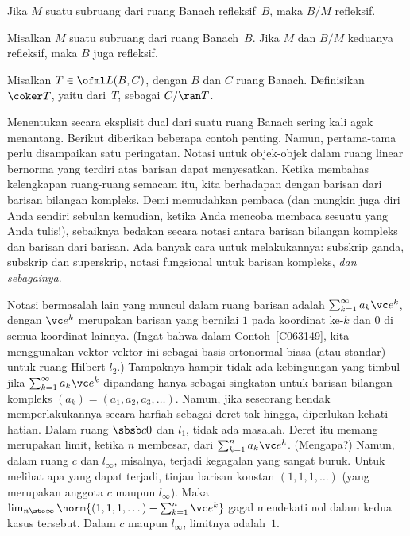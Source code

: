 \begin{cor} Jika $M$ suatu subruang dari ruang Banach refleksif~$B$, maka $B/M$ refleksif.
\end{cor}

\begin{cor} Misalkan $M$ suatu subruang dari ruang Banach~$B$. Jika $M$ dan $B/M$ keduanya refleksif,
maka $B$ juga refleksif.
\end{cor}



















\begin{defn} Misalkan $T \in \ofml L(B,C)$, dengan $B$ dan $C$ ruang Banach. Definisikan
$\coker T$, yaitu
 dari~$T$, sebagai $C/\ran T$.
\end{defn}



Menentukan secara eksplisit dual dari suatu ruang Banach sering kali agak menantang. Berikut diberikan beberapa
contoh penting. Namun, pertama-tama perlu disampaikan satu peringatan. Notasi untuk objek-objek dalam ruang linear bernorma
yang terdiri atas barisan dapat menyesatkan. Ketika membahas kelengkapan ruang-ruang semacam itu, kita berhadapan dengan barisan dari
barisan bilangan kompleks. Demi memudahkan pembaca (dan mungkin juga diri Anda sendiri sebulan kemudian,
ketika Anda mencoba membaca sesuatu yang Anda tulis!), sebaiknya bedakan secara notasi antara barisan bilangan kompleks
dan barisan dari barisan. Ada banyak cara untuk melakukannya: subskrip ganda, subskrip dan
superskrip, notasi fungsional untuk barisan kompleks, \emph{dan sebagainya}.

Notasi bermasalah lain yang muncul dalam ruang barisan adalah $\sum_{k=1}^\infty a_k \vc e^k$, dengan $\vc e^k$
merupakan barisan yang bernilai $1$ pada koordinat ke-$k$ dan $0$ di semua koordinat lainnya. (Ingat bahwa dalam
Contoh~\ref{C063149}, kita menggunakan vektor-vektor ini sebagai basis ortonormal biasa (atau standar) untuk ruang Hilbert
$l_2$.) Tampaknya hampir tidak ada kebingungan yang timbul jika $\sum_{k=1}^\infty a_k \vc e^k$ dipandang
hanya sebagai singkatan untuk barisan bilangan kompleks $(a_k) = (a_1,a_2,a_3,\dots)$. Namun, jika seseorang hendak
memperlakukannya secara harfiah sebagai deret tak hingga, diperlukan kehati-hatian. Dalam ruang $\sbsb c0$ dan $l_1$, tidak ada
masalah. Deret itu memang merupakan limit, ketika $n$ membesar, dari $\sum_{k=1}^n a_k \vc e^k$. (Mengapa?) Namun, dalam ruang
$c$ dan $l_\infty$, misalnya, terjadi kegagalan yang sangat buruk. Untuk melihat apa yang dapat terjadi, tinjau barisan konstan
$(1,1,1,\dots)$ (yang merupakan anggota $c$ maupun $l_\infty$). Maka
$\lim_{n \sto\infty}\norm{(1,1,1,\dots) - \sum_{k=1}^n \vc e^k}$ gagal mendekati nol dalam kedua kasus tersebut.
Dalam $c$ maupun $l_\infty$, limitnya adalah~$1$.

